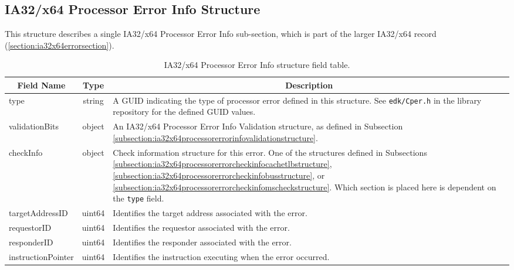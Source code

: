 \documentclass{report}
\newcommand*{\thead}[1]{\multicolumn{1}{|c|}{\bfseries #1}}
\newcommand*{\jsontable}[1]{
    \begin{table}[!ht]
    \label{#1}
    \centering
    \begin{adjustbox}{center}
    \begin{tabular}{|l|c|p{8cm}|}
    \hline
    \thead{Field Name} & \thead{Type} & \thead{Description} \\
    \hline
}
\newcommand*{\jsontableend}[1]{
    \hline
    \end{tabular}
    \end{adjustbox}
    \caption{#1}
    \label{table:#1}
    \end{table}
    \FloatBarrier
}
\begin{document}
\subsection{IA32/x64 Processor Error Info Structure}
\label{subsection:ia32x64processorerrorinfostructure}
This structure describes a single IA32/x64 Processor Error Info sub-section, which is part of the larger IA32/x64 record (\ref{section:ia32x64errorsection}).
\jsontable{table:ia32x64processorerrorinfostructure}
type & string & A GUID indicating the type of processor error defined in this structure. See \texttt{edk/Cper.h} in the library repository for the defined GUID values.\\
\hline
validationBits & object & An IA32/x64 Processor Error Info Validation structure, as defined in Subsection \ref{subsection:ia32x64processorerrorinfovalidationstructure}.\\
\hline
checkInfo & object & Check information structure for this error. One of the structures defined in Subsections \ref{subsection:ia32x64processorerrorcheckinfocachetlbstructure}, \ref{subsection:ia32x64processorerrorcheckinfobusstructure}, or \ref{subsection:ia32x64processorerrorcheckinfomscheckstructure}. Which section is placed here is dependent on the \texttt{type} field.\\
\hline
targetAddressID & uint64 & Identifies the target address associated with the error.\\
\hline
requestorID & uint64 & Identifies the requestor associated with the error.\\
\hline
responderID & uint64 & Identifies the responder associated with the error.\\
\hline
instructionPointer & uint64 & Identifies the instruction executing when the error occurred.\\ 
\jsontableend{IA32/x64 Processor Error Info structure field table.}

\end{document}
